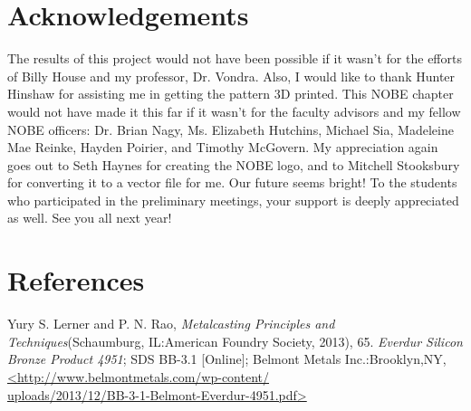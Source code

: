 \documentclass{article}
\begin{document}
\section{Acknowledgements}


The results of this project would not have been possible if it wasn't for the efforts of Billy House and my professor, Dr. Vondra. Also, I would like to thank Hunter Hinshaw for assisting me in getting the pattern 3D printed. This NOBE chapter would not have made it this far if it wasn't for the faculty advisors and my fellow NOBE officers: Dr. Brian Nagy, Ms. Elizabeth Hutchins, Michael Sia, Madeleine Mae Reinke, Hayden Poirier, and Timothy McGovern. My appreciation again goes out to Seth Haynes for creating the NOBE logo, and to Mitchell Stooksbury for converting it to a vector file for me. Our future seems bright! To the students who participated in the preliminary meetings, your support is deeply appreciated as well. See you all next year!

\section{References}
  
\cleardoublepage
\begin{thebibliography}{9}
 Yury S. Lerner and P. N. Rao, \textit{Metalcasting Principles and Techniques}(Schaumburg, IL:American Foundry Society, 2013), 65.
 \textit{Everdur Silicon Bronze Product 4951}; SDS BB-3.1 [Online]; Belmont Metals Inc.:Brooklyn,NY,\url{<http://www.belmontmetals.com/wp-content/} \\
\url{uploads/2013/12/BB-3-1-Belmont-Everdur-4951.pdf>}

\end{thebibliography} 
\end{document}
